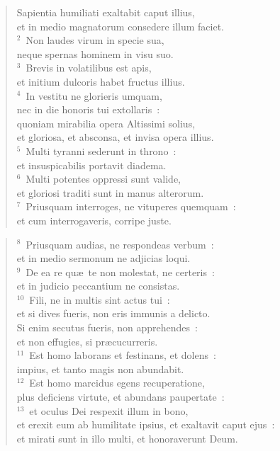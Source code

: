 \begin{flushleft}\begin{verse}\vspace{-19pt}\hspace{6pt}Sapientia humiliati exaltabit caput illius,\\\hspace{6pt} et in medio magnatorum consedere illum faciet.\\
${}^{2}$~Non laudes virum in specie sua,\\ neque spernas hominem in visu suo.\\
${}^{3}$~Brevis in volatilibus est apis,\\ et initium dulcoris habet fructus illius.\\
${}^{4}$~In vestitu ne glorieris umquam,\\ nec in die honoris tui extollaris~:\\ quoniam mirabilia opera Altissimi solius,\\ et gloriosa, et absconsa, et invisa opera illius.\\
${}^{5}$~Multi tyranni sederunt in throno~:\\ et insuspicabilis portavit diadema.\\
${}^{6}$~Multi potentes oppressi sunt valide,\\ et gloriosi traditi sunt in manus alterorum.\\
${}^{7}$~Priusquam interroges, ne vituperes quemquam~:\\ et cum interrogaveris, corripe juste.\end{verse}\end{flushleft}


\begin{flushleft}\begin{verse}${}^{8}$~Priusquam audias, ne respondeas verbum~:\\ et in medio sermonum ne adjicias loqui.\\
${}^{9}$~De ea re qu\ae\ te non molestat, ne certeris~:\\ et in judicio peccantium ne consistas.\\
${}^{10}$~Fili, ne in multis sint actus tui~:\\ et si dives fueris, non eris immunis a delicto.\\ Si enim secutus fueris, non apprehendes~:\\ et non effugies, si pr\ae cucurreris.\\
${}^{11}$~Est homo laborans et festinans, et dolens~:\\ impius, et tanto magis non abundabit.\\
${}^{12}$~Est homo marcidus egens recuperatione,\\ plus deficiens virtute, et abundans paupertate~:\\
${}^{13}$~et oculus Dei respexit illum in bono,\\ et erexit eum ab humilitate ipsius, et exaltavit caput ejus~:\\ et mirati sunt in illo multi, et honoraverunt Deum.\end{verse}\end{flushleft}


